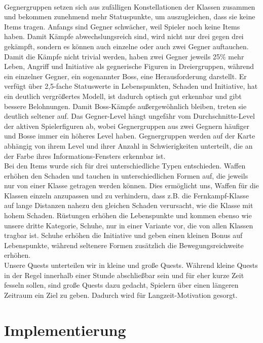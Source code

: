 \documentclass[extern,palatino]{cgBA}
\begin{document}
\\Gegnergruppen setzen sich aus zufälligen Konstellationen der Klassen zusammen und bekommen zunehmend mehr Statuspunkte, um auszugleichen, dass sie keine Items tragen. Anfangs sind Gegner schwächer, weil Spieler noch keine Items haben. Damit Kämpfe abwechslungsreich sind, wird nicht nur drei gegen drei gekämpft, sondern es können auch einzelne oder auch zwei Gegner auftauchen. Damit die Kämpfe nicht trivial werden, haben zwei Gegner jeweils 25\% mehr Leben, Angriff und Initiative als gegnerische Figuren in Dreiergruppen, während ein einzelner Gegner, ein sogenannter Boss, eine Herausforderung darstellt. Er verfügt über 2,5-fache Statuswerte in Lebenspunkten, Schaden und Initiative, hat ein deutlich vergrößertes Modell, ist dadurch optisch gut erkennbar und gibt bessere Belohnungen. Damit Boss-Kämpfe außergewöhnlich bleiben, treten sie deutlich seltener auf. Das Gegner-Level hängt ungefähr vom Durchschnitts-Level der aktiven Spielerfiguren ab, wobei Gegnergruppen aus zwei Gegnern häufiger und Bosse immer ein höheres Level haben. Gegnergruppen werden auf der Karte abhängig von ihrem Level und ihrer Anzahl in Schwierigkeiten unterteilt, die an der Farbe ihres Informations-Fensters erkennbar ist.
\\Bei den Items wurde sich für drei unterschiedliche Typen entschieden. Waffen erhöhen den Schaden und tauchen in unterschiedlichen Formen auf, die jeweils nur von einer Klasse getragen werden können. Dies ermöglicht uns, Waffen für die Klassen einzeln anzupassen und zu verhindern, dass z.B. die Fernkampf-Klasse auf lange Distanzen nahezu den gleichen Schaden verursacht, wie die Klasse mit hohem Schaden. Rüstungen erhöhen die Lebenspunkte und kommen ebenso wie unsere dritte Kategorie, Schuhe, nur in einer Variante vor, die von allen Klassen tragbar ist. Schuhe erhöhen die Initiative und geben einen kleinen Bonus auf Lebenspunkte, während seltenere Formen zusätzlich die Bewegungsreichweite erhöhen.
\\Unsere Quests unterteilen wir in kleine und große Quests. Während kleine Quests in der Regel innerhalb einer Stunde abschließbar sein und für eher kurze Zeit fesseln sollen, sind große Quests dazu gedacht, Spielern über einen längeren Zeitraum ein Ziel zu geben. Dadurch wird für Langzeit-Motivation gesorgt.
\newpage\section{Implementierung}\label{imp}
\end{document}
